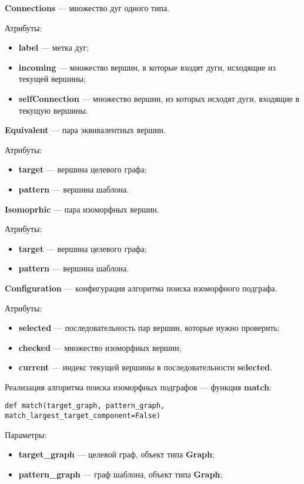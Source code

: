 \textbf{Connections} --- множество дуг одного типа.

Атрибуты:
\begin{itemize}
\item \textbf{label} --- метка дуг;
\item \textbf{incoming} --- множество вершин, в которые входят дуги, исходящие из текущей вершины;
\item \textbf{selfConnection} --- множество вершин, из которых исходят дуги, входящие в текущую вершины.
\end{itemize}

\textbf{Equivalent} --- пара эквивалентных вершин.

Атрибуты:
\begin{itemize}
\item \textbf{target} --- вершина целевого графа;
\item \textbf{pattern} --- вершина шаблона.
\end{itemize}

\textbf{Isomoprhic} --- пара изоморфных вершин.

Атрибуты:
\begin{itemize}
\item \textbf{target} --- вершина целевого графа;
\item \textbf{pattern} --- вершина шаблона.
\end{itemize}

\textbf{Configuration} --- конфигурация алгоритма поиска изоморфного подграфа.

Атрибуты:
\begin{itemize}
\item \textbf{selected} --- последовательность пар вершин, которые нужно проверить;
\item \textbf{checked} --- множество изоморфных вершин;
\item \textbf{current} --- индекс текущей вершины в последовательности \textbf{selected}.
\end{itemize}

Реализация алгоритма поиска изоморфных подграфов --- функция \textbf{match}:

\begin{verbatim}
def match(target_graph, pattern_graph, match_largest_target_component=False)
\end{verbatim}

Параметры:
\begin{itemize}
\item \textbf{target\_graph} --- целевой граф, объект типа \textbf{Graph};
\item \textbf{pattern\_graph} --- граф шаблона, объект типа \textbf{Graph};
\end{itemize}

